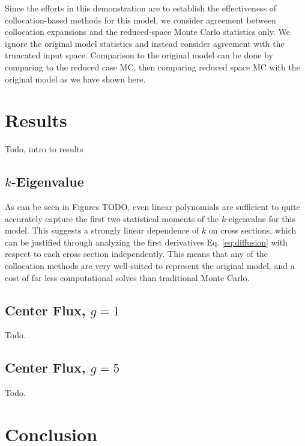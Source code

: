 Since the efforts in this demonstration are to establish the effectiveness of collocation-based methods for
this model, we consider agreement between collocation expansions and the reduced-space Monte Carlo statistics only.
We ignore the original model statistics and instead consider agreement with the truncated input space.
Comparison to the original model can be done by comparing to the reduced case MC, then comparing reduced space
MC with the original model as we have shown here.

\section{Results}
Todo, intro to results

\subsection{$k$-Eigenvalue}
As can be seen in Figures TODO, even linear polynomials are sufficient to quite accurately capture the first
two statistical moments of the $k$-eigenvalue for this model.  This suggests a strongly linear dependence of
$k$ on cross sections, which can be justified through analyzing the first derivatives Eq. \ref{eq:diffusion}
with respect to each cross section independently.  This means that any of the collocation methods are very
well-suited to represent the original model, and a cost of far less computational solves than traditional
Monte Carlo.

\subsection{Center Flux, $g=1$}
Todo.

\subsection{Center Flux, $g=5$}
Todo.

\section{Conclusion}
